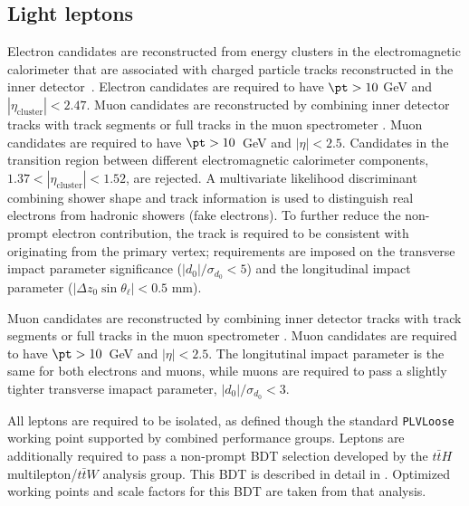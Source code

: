 \subsection{Light leptons}
\label{subsec:leps}

Electron candidates are reconstructed from energy clusters in the electromagnetic calorimeter that are associated with charged particle tracks reconstructed in the inner detector~\cite{ATLAS-CONF-2016-024}. Electron candidates are required to have $\pt > 10$ GeV and $|\eta_\textrm{cluster}| < 2.47$. Muon candidates are reconstructed by combining inner detector tracks with track segments or full tracks in the muon spectrometer \cite{PERF-2014-05}. Muon candidates are required to have $\pt > 10$~GeV and $|\eta| < 2.5$. Candidates in the transition region between different electromagnetic calorimeter components, $1.37 < |\eta_\textrm{cluster}| < 1.52$, are rejected. A multivariate likelihood discriminant combining shower shape and track information is used to distinguish real electrons from hadronic showers (fake electrons). To further reduce the non-prompt electron contribution, the track is required to be consistent with originating from the primary vertex; requirements are imposed on the transverse impact parameter significance ($|d_0|/\sigma_{d_0}<5$) and the longitudinal impact parameter ($|\Delta z_0 \sin \theta_\ell| < 0.5$ mm).
                   
Muon candidates are reconstructed by combining inner detector tracks with track segments or full tracks in the muon spectrometer \cite{PERF-2014-05}. Muon candidates are required to have $\pt > 10$~GeV and $|\eta| < 2.5$. The longitutinal impact parameter is the same for both electrons and muons, while muons are required to pass a slightly tighter transverse imapact parameter, $|d_0|/\sigma_{d_0}<3$. 

All leptons are required to be isolated, as defined though the standard \verb|PLVLoose| working point supported by combined performance groups. Leptons are additionally required to pass a non-prompt BDT selection developed by the $t\bar{t}H$ multilepton/$t\bar{t}W$ analysis group. This BDT is described in detail in \cite{ttW_140}. Optimized working points and scale factors for this BDT are taken from that analysis.

